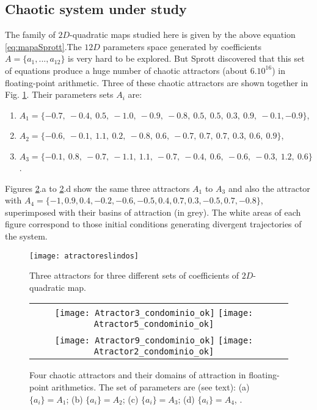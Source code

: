 \subsection{Chaotic system under study}
\label{sec:chaos}

The  family of $2D$-quadratic maps studied here is given by the
 above equation \ref{eq:mapaSprott}.The $12D$ parameters space generated by coefficients $A=\{a_1,...,a_{12}\}$  is very hard to be explored. But Sprott
discovered that this set of equations produce a huge number of
chaotic attractors (about $6 .  10^{16}$) in floating-point
arithmetic. Three of these chaotic attractors are shown together in Fig. \ref{fig:atractores}. Their parameters sets $A_i$ are:
%
\begin{enumerate}[label=(\alph*)]
\item $A_1=\{-0.7,~-0.4,~0.5,~-1.0,~ -0.9,~ -0.8, ~0.5, ~0.5,~0.3,~0.9,~-0.1,-0.9\}$,
\item $A_2=\{-0.6,~-0.1,~1.1,~0.2,~-0.8,~0.6,~-0.7,~0.7,~0.7,~0.3,~0.6,~0.9\}$, 
\item $A_3=\{ -0.1,~ 0.8,~ -0.7,~ -1.1,~1.1,~-0.7,~-0.4,~ 0.6,~ -0.6,~-0.3,~1.2,~0.6\}$.
\end{enumerate}

%

Figures \ref{fig:atractores3592}.a to \ref{fig:atractores3592}.d show the same three attractors $A_1$ to $A_3$  and also the attractor with $A_4=\{-1,0.9,0.4,-0.2,-0.6,-0.5,0.4,0.7,0.3,-0.5,0.7,-0.8\}$, superimposed with their basins of attraction (in grey).  The white areas of each figure correspond to 
those initial conditions generating divergent trajectories of the system.

\begin{figure}
    \centering
    \texttt{[image: atractoreslindos]}\\
    \caption{Three attractors for three different sets of  coefficients of $2D$-quadratic map.}\label{fig:atractores}
\end{figure}
%
\begin{figure}
\begin{tabular}{cc}
\texttt{[image: Atractor3\_condominio\_ok]}
\texttt{[image: Atractor5\_condominio\_ok]}\\
\texttt{[image: Atractor9\_condominio\_ok]}
\texttt{[image: Atractor2\_condominio\_ok]}
\end{tabular}
\caption{Four chaotic attractors and their domains of attraction in floating-point arithmetics. The set of parameters are (see text):
(a) $\{a_i\}=A_1$; (b)  $\{a_i\}=A_2$; (c)  $\{a_i\}=A_3$;  (d) $\{a_i\}=A_4$, \cite{Sprott1993}.}
\label{fig:atractores3592}
\end{figure}